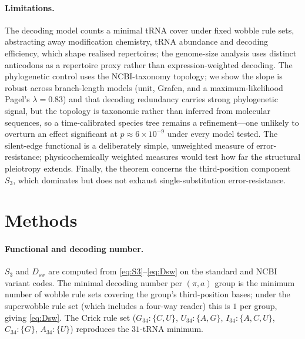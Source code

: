 \documentclass[11pt]{article}
\theoremstyle{remark}
\newcommand{\Dsw}{D_{\mathrm{sw}}}
\newcommand{\Sthree}{S_3}
\begin{document}
\paragraph{Limitations.} The decoding model counts a minimal tRNA cover under
fixed wobble rule sets, abstracting away modification chemistry, tRNA abundance
and decoding efficiency, which shape realised repertoires; the genome-size
analysis uses distinct anticodons as a repertoire proxy rather than
expression-weighted decoding. The phylogenetic control uses the
NCBI-taxonomy topology; we show the slope is robust across branch-length models
(unit, Grafen, and a maximum-likelihood Pagel's $\lambda=0.83$) and that decoding
redundancy carries strong phylogenetic signal, but the topology is taxonomic
rather than inferred from molecular sequences, so a time-calibrated species tree
remains a refinement---one unlikely to overturn an effect significant at
$p\approx6\times10^{-9}$ under every model tested. The
silent-edge functional is a deliberately simple, unweighted measure of
error-resistance; physicochemically weighted measures \cite{haig,freeland} would
test how far the structural pleiotropy extends. Finally, the theorem concerns the
third-position component $\Sthree$, which dominates but does not exhaust
single-substitution error-resistance.

\section{Methods}

\paragraph{Functional and decoding number.} $\Sthree$ and $\Dsw$ are computed
from \eqref{eq:S3}--\eqref{eq:Dsw} on the standard and NCBI variant codes. The
minimal decoding number per $(\pi,a)$ group is the minimum number of wobble rule
sets covering the group's third-position bases; under the superwobble rule set
(which includes a four-way reader) this is $1$ per group, giving \eqref{eq:Dsw}.
The Crick rule set ($G_{34}\!:\!\{C,U\}$, $U_{34}\!:\!\{A,G\}$,
$I_{34}\!:\!\{A,C,U\}$, $C_{34}\!:\!\{G\}$, $A_{34}\!:\!\{U\}$) reproduces the
$31$-tRNA minimum.
\end{document}
